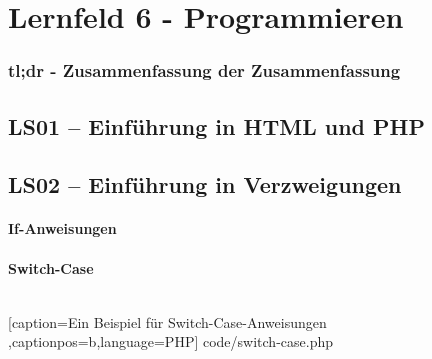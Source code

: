 \section{Lernfeld 6 - Programmieren}

\subsubsection{tl;dr - Zusammenfassung der Zusammenfassung}


\subsection{LS01 -- Einführung in HTML und PHP}


\subsection{LS02 -- Einführung in Verzweigungen}

\paragraph{If-Anweisungen}

\paragraph{Switch-Case}
\begin{tabular}{l|l|l}

\end{tabular}

	[caption={Ein Beispiel für Switch-Case-Anweisungen}
	\label{lst:Switch-Case},captionpos=b,language=PHP]
	{code/switch-case.php}
	
